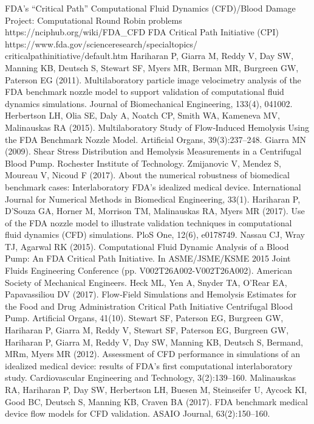  FDA’s ``Critical Path'' Computational Fluid Dynamics (CFD)/Blood Damage Project: Computational Round Robin problems
https://nciphub.org/wiki/FDA\_CFD
 FDA Critical Path Initiative (CPI) \\https://www.fda.gov/scienceresearch/specialtopics/\\criticalpathinitiative/default.htm
 Hariharan P, Giarra M, Reddy V, Day SW, Manning KB, Deutsch S, Stewart SF, Myers MR, Berman MR, Burgreen GW, Paterson EG (2011). Multilaboratory particle image velocimetry analysis of the FDA benchmark nozzle model to support validation of computational fluid dynamics simulations. Journal of Biomechanical Engineering, 133(4), 041002.
 Herbertson LH, Olia SE, Daly A, Noatch CP, Smith WA, Kameneva MV, Malinauskas RA (2015).
Multilaboratory Study of Flow‐Induced Hemolysis Using the FDA Benchmark Nozzle Model. Artificial Organs, 39(3):237--248.
 Giarra MN (2009). Shear Stress Distribution and Hemolysis Measurements in a Centrifugal Blood Pump. Rochester Institute of Technology.
 Zmijanovic V, Mendez S, Moureau V, Nicoud F (2017). About the numerical robustness of biomedical benchmark cases: Interlaboratory FDA's idealized medical device. International Journal for Numerical Methods in Biomedical Engineering, 33(1).
 Hariharan P, D’Souza GA, Horner M, Morrison TM, Malinauskas RA, Myers MR (2017). Use of the FDA nozzle model to illustrate validation techniques in computational fluid dynamics (CFD) simulations. PloS One, 12(6), e0178749.
 Nassau CJ, Wray TJ, Agarwal RK (2015). Computational Fluid Dynamic Analysis of a Blood Pump: An FDA Critical Path Initiative. In ASME/JSME/KSME 2015 Joint Fluids Engineering Conference (pp. V002T26A002-V002T26A002). American Society of Mechanical Engineers.
 Heck ML, Yen A, Snyder TA, O'Rear EA, Papavassiliou DV (2017). Flow‐Field Simulations and Hemolysis Estimates for the Food and Drug Administration Critical Path Initiative Centrifugal Blood Pump. Artificial Organs, 41(10).
 Stewart SF, Paterson EG, Burgreen GW, Hariharan P, Giarra M, Reddy V, Stewart SF, Paterson EG, Burgreen GW, Hariharan P, Giarra M, Reddy V, Day SW, Manning KB, Deutsch S, Bermand, MRm, Myers MR (2012). Assessment of CFD performance in simulations of an idealized medical device: results of FDA’s first computational interlaboratory study. Cardiovascular Engineering and Technology, 3(2):139--160.
 Malinauskas RA, Hariharan P, Day SW, Herbertson LH, Buesen M, Steinseifer U, Aycock KI, Good BC, Deutsch S, Manning KB, Craven BA (2017). FDA benchmark medical device flow models for CFD validation. ASAIO Journal, 63(2):150--160.
